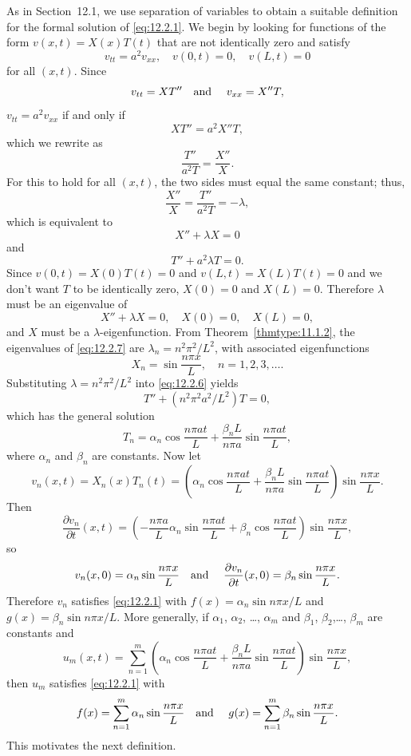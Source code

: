 \noindent
As in Section~12.1, we use separation of variables to obtain a suitable definition for the formal
solution of \eqref{eq:12.2.1}. We begin by looking for functions of the form $v(x,t)=X(x)T(t)$ that
are not identically zero and satisfy
\[
  v_{tt}=a^{2}v_{xx},\quad v(0,t)=0,\quad v(L,t)=0
\]
for all $(x,t)$. Since
\[
  v_{tt}=XT''\mbox{\quad and \quad}v_{xx}=X''T,
\]
$v_{tt}=a^{2}v_{xx}$ if and only if
\[
  XT''=a^{2}X''T,
\]
which we rewrite as
\[
  \frac{T''}{a^{2}T}=\frac{X''}{X}.
\]
For this to hold for all $(x,t)$, the two sides must equal the same constant; thus,
\[
  \frac{X''}{X}=\frac{T''}{a^{2}T}=-\lambda,
\]
which is equivalent to
\[
  X''+\lambda X=0
\]
and
\begin{equation}
  \label{eq:12.2.6}T''+a^{2}\lambda T=0.
\end{equation}
Since $v(0,t)=X(0)T(t)=0$ and $v(L,t)=X(L)T(t)=0$ and we don't want $T$ to be identically zero,
$X(0)=0$ and $X(L)=0$. Therefore $\lambda$ must be an eigenvalue of
\begin{equation}
  \label{eq:12.2.7}X''+\lambda X=0,\quad X(0)=0,\quad X(L)=0,
\end{equation}
and $X$ must be a $\lambda$-eigenfunction. From Theorem~\ref{thmtype:11.1.2}, the eigenvalues of
\eqref{eq:12.2.7} are $\lambda_{n}=n^{2}\pi^{2}/L^{2}$, with associated eigenfunctions
\[
  X_{n}=\sin\frac{n\pi x}{L},\quad n=1,2,3,\dots.
\]
Substituting $\lambda=n^{2}\pi^{2}/L^{2}$ into \eqref{eq:12.2.6} yields
\[
  T''+(n^{2}\pi^{2}a^{2}/L^{2})T=0,
\]
which has the general solution
\[
  T_{n}=\alpha_{n}\cos\frac{n\pi at}{L}+\frac{\beta_{n}L}{n\pi a}\sin\frac{n\pi at}{L},
\]
where $\alpha_{n}$ and $\beta_{n}$ are constants. Now let
\[
  v_{n}(x,t)=X_{n}(x)T_{n}(t)=\left(\alpha_{n}\cos\frac{n\pi at}{L}+ \frac{\beta_{n}L}{n\pi a}\sin\frac{n\pi at}{L}\right) \sin\frac{n\pi x}{L}.
\]
Then
\[
  \frac{\partial v_{n}}{\partial t}(x,t)= \left(-\frac{n\pi a}{L}\alpha_{n}\sin\frac{n\pi at}{L}+\beta_{n}\cos\frac{n\pi at}{L}\right)\sin\frac{n\pi x}{L},
\]
so
\[
  v_{n}(x,0)=\alpha_{n}\sin\frac{n\pi x}{L}\mbox{\quad and \quad}{\frac{\partial v_{n}}{\partial t}}(x,0)=\beta_{n}\sin\frac{n\pi x}{L}.
\]
Therefore $v_{n}$ satisfies \eqref{eq:12.2.1} with $f(x)=\alpha_{n}\sin n\pi x/L$ and
$g(x)=\beta_{n}\sin n\pi x/L$. More generally, if $\alpha_{1}$, $\alpha_{2}$, \dots, $\alpha_{m}$
and $\beta_{1}$, $\beta_{2}$,\dots, $\beta_{m}$ are constants and
\[
  u_{m}(x,t)=\sum_{n=1}^{m}\left(\alpha_{n}\cos\frac{n\pi at}{L}+\frac{\beta_{n}L}{n\pi a}\sin\frac{n\pi at}{L}\right) \sin\frac{n\pi x}{L},
\]
then $u_{m}$ satisfies \eqref{eq:12.2.1} with
\[
  f(x)=\sum_{n=1}^{m}\alpha_{n}\sin\frac{n\pi x}{L}\mbox{\quad and \quad}g(x)=\sum_{n=1}^{m}\beta_{n}\sin\frac{n\pi x}{L}.
\]
This motivates the next definition.


